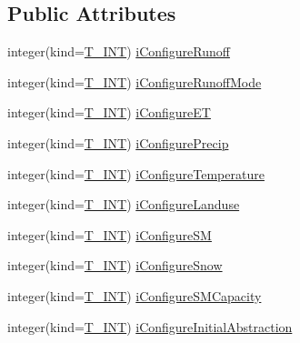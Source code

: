 \subsection*{Public Attributes}
\begin{DoxyCompactItemize}
\item 
integer(kind=\hyperlink{namespacetypes_a4e4d040a4425196c4d43be63e7e6103a}{T\_\-INT}) \hyperlink{typetypes_1_1_t___m_o_d_e_l___c_o_n_f_i_g_u_r_a_t_i_o_n_ab71a98c2cc606a9be24f81804fb18adb}{iConfigureRunoff}
\item 
integer(kind=\hyperlink{namespacetypes_a4e4d040a4425196c4d43be63e7e6103a}{T\_\-INT}) \hyperlink{typetypes_1_1_t___m_o_d_e_l___c_o_n_f_i_g_u_r_a_t_i_o_n_a7d28fdb713cbf19fa0943ad73bbd0bda}{iConfigureRunoffMode}
\item 
integer(kind=\hyperlink{namespacetypes_a4e4d040a4425196c4d43be63e7e6103a}{T\_\-INT}) \hyperlink{typetypes_1_1_t___m_o_d_e_l___c_o_n_f_i_g_u_r_a_t_i_o_n_acb5433d1af15247b5bae06192232a15e}{iConfigureET}
\item 
integer(kind=\hyperlink{namespacetypes_a4e4d040a4425196c4d43be63e7e6103a}{T\_\-INT}) \hyperlink{typetypes_1_1_t___m_o_d_e_l___c_o_n_f_i_g_u_r_a_t_i_o_n_a74e18adf0c62b1cc8e02c5152b8d769f}{iConfigurePrecip}
\item 
integer(kind=\hyperlink{namespacetypes_a4e4d040a4425196c4d43be63e7e6103a}{T\_\-INT}) \hyperlink{typetypes_1_1_t___m_o_d_e_l___c_o_n_f_i_g_u_r_a_t_i_o_n_afde4c843176d46a24913368d1de82ac2}{iConfigureTemperature}
\item 
integer(kind=\hyperlink{namespacetypes_a4e4d040a4425196c4d43be63e7e6103a}{T\_\-INT}) \hyperlink{typetypes_1_1_t___m_o_d_e_l___c_o_n_f_i_g_u_r_a_t_i_o_n_ae871bc1419478bdc46f7aaa05cf8a55a}{iConfigureLanduse}
\item 
integer(kind=\hyperlink{namespacetypes_a4e4d040a4425196c4d43be63e7e6103a}{T\_\-INT}) \hyperlink{typetypes_1_1_t___m_o_d_e_l___c_o_n_f_i_g_u_r_a_t_i_o_n_a650ebd6690319e59e9da1272d3f678fa}{iConfigureSM}
\item 
integer(kind=\hyperlink{namespacetypes_a4e4d040a4425196c4d43be63e7e6103a}{T\_\-INT}) \hyperlink{typetypes_1_1_t___m_o_d_e_l___c_o_n_f_i_g_u_r_a_t_i_o_n_ae161338bd5d8890d5264205f231409ac}{iConfigureSnow}
\item 
integer(kind=\hyperlink{namespacetypes_a4e4d040a4425196c4d43be63e7e6103a}{T\_\-INT}) \hyperlink{typetypes_1_1_t___m_o_d_e_l___c_o_n_f_i_g_u_r_a_t_i_o_n_ae467dbeeac893d8db4f2a787a6af24d0}{iConfigureSMCapacity}
\item 
integer(kind=\hyperlink{namespacetypes_a4e4d040a4425196c4d43be63e7e6103a}{T\_\-INT}) \hyperlink{typetypes_1_1_t___m_o_d_e_l___c_o_n_f_i_g_u_r_a_t_i_o_n_afa9b5edda9f4d344a1dfd91b444afec4}{iConfigureInitialAbstraction}

\end{DoxyCompactItemize}
